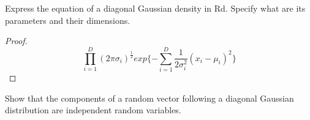 \documentclass[12pt]{article}
\newenvironment{problem}[2][Problem]{\begin{trivlist}
\item[\hskip \labelsep {\bfseries #1}\hskip \labelsep {\bfseries #2.}]}{\end{trivlist}}
\begin{document}
\begin{problem}{3.4 (a)}
Express the equation of a diagonal Gaussian density in Rd. Specify what are its parameters and their dimensions.
\end{problem}

\begin{proof}
\begin{equation*}
\prod_{i=1}^{D} (2\pi \sigma_{i})^{\frac{1}{2}} exp\{{- \sum_{i=1}^{D}} \frac{1}{2 \sigma_{i} ^2} (x_{i} - \mu_{i})^2 \} 
\end{equation*}
\end{proof}


\begin{problem}{3.4 (b)}
Show that the components of a random vector following a diagonal Gaussian distribution are independent random variables.
\end{problem}
\end{document}

